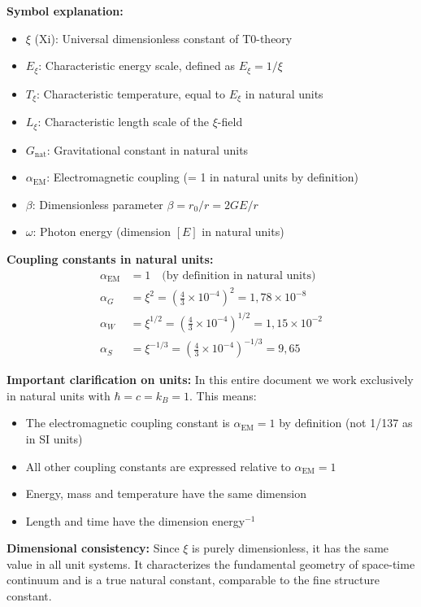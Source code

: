 \documentclass[12pt,a4paper]{article}
\theoremstyle{definition}
\theoremstyle{remark}
\begin{document}
	\textbf{Symbol explanation:}
	\begin{itemize}
		\item $\xi$ (Xi): Universal dimensionless constant of T0-theory
		\item $E_\xi$: Characteristic energy scale, defined as $E_\xi = 1/\xi$
		\item $T_\xi$: Characteristic temperature, equal to $E_\xi$ in natural units
		\item $L_\xi$: Characteristic length scale of the $\xi$-field
		\item $G_{\text{nat}}$: Gravitational constant in natural units
		\item $\alpha_{\text{EM}}$: Electromagnetic coupling (= 1 in natural units by definition)
		\item $\beta$: Dimensionless parameter $\beta = r_0/r = 2GE/r$
		\item $\omega$: Photon energy (dimension $[E]$ in natural units)
	\end{itemize}
	
	\textbf{Coupling constants in natural units:}
	\begin{align}
		\alpha_{\text{EM}} &= 1 \quad \text{(by definition in natural units)} \\
		\alpha_G &= \xi^2 = \left(\frac{4}{3} \times 10^{-4}\right)^2 = 1{,}78 \times 10^{-8} \\
		\alpha_W &= \xi^{1/2} = \left(\frac{4}{3} \times 10^{-4}\right)^{1/2} = 1{,}15 \times 10^{-2} \\
		\alpha_S &= \xi^{-1/3} = \left(\frac{4}{3} \times 10^{-4}\right)^{-1/3} = 9{,}65
	\end{align}
	
	\textbf{Important clarification on units:}
	In this entire document we work exclusively in natural units with $\hbar = c = k_B = 1$. This means:
	\begin{itemize}
		\item The electromagnetic coupling constant is $\alpha_{\text{EM}} = 1$ by definition (not 1/137 as in SI units)
		\item All other coupling constants are expressed relative to $\alpha_{\text{EM}} = 1$
		\item Energy, mass and temperature have the same dimension
		\item Length and time have the dimension energy$^{-1}$
	\end{itemize}
	
	\textbf{Dimensional consistency:} Since $\xi$ is purely dimensionless, it has the same value in all unit systems. It characterizes the fundamental geometry of space-time continuum and is a true natural constant, comparable to the fine structure constant.
	
\end{document}
